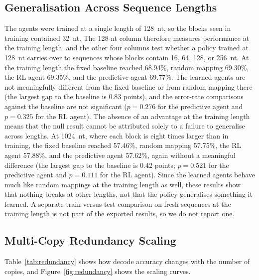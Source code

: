 \documentclass[entropy,article,submit,moreauthors]{Definitions/mdpi}
\begin{document}
\subsection{Generalisation Across Sequence Lengths}

The agents were trained at a single length of 128~nt, so the blocks seen in training contained 32~nt. The 128-nt column therefore measures performance at the training length, and the other four columns test whether a policy trained at 128~nt carries over to sequences whose blocks contain 16, 64, 128, or 256~nt. At the training length the fixed baseline reached 68.94\%, random mapping 69.30\%, the RL agent 69.35\%, and the predictive agent 69.77\%. The learned agents are not meaningfully different from the fixed baseline or from random mapping there (the largest gap to the baseline is 0.83 points), and the error-rate comparisons against the baseline are not significant ($p = 0.276$ for the predictive agent and $p = 0.325$ for the RL agent). The absence of an advantage at the training length means that the null result cannot be attributed solely to a failure to generalise across lengths. At 1024~nt, where each block is eight times larger than in training, the fixed baseline reached 57.46\%, random mapping 57.75\%, the RL agent 57.88\%, and the predictive agent 57.62\%, again without a meaningful difference (the largest gap to the baseline is 0.42 points; $p = 0.521$ for the predictive agent and $p = 0.111$ for the RL agent). Since the learned agents behave much like random mappings at the training length as well, these results show that nothing breaks at other lengths, not that the policy generalises something it learned. A separate train-versus-test comparison on fresh sequences at the training length is not part of the exported results, so we do not report one.

\subsection{Multi-Copy Redundancy Scaling}
\label{sec:scaling}

Table~\ref{tab:redundancy} shows how decode accuracy changes with the number of copies, and Figure~\ref{fig:redundancy} shows the scaling curves.
\end{document}
